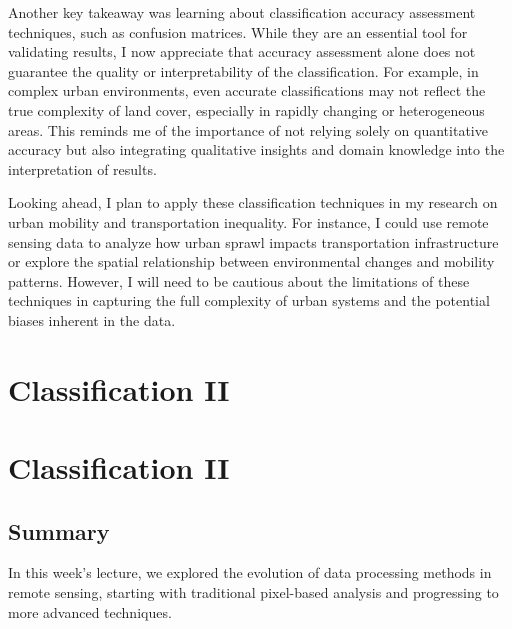 \documentclass[
  letterpaper,
  DIV=11,
  numbers=noendperiod]{scrreprt}
\begin{document}
Another key takeaway was learning about classification accuracy
assessment techniques, such as confusion matrices. While they are an
essential tool for validating results, I now appreciate that accuracy
assessment alone does not guarantee the quality or interpretability of
the classification. For example, in complex urban environments, even
accurate classifications may not reflect the true complexity of land
cover, especially in rapidly changing or heterogeneous areas. This
reminds me of the importance of not relying solely on quantitative
accuracy but also integrating qualitative insights and domain knowledge
into the interpretation of results.

Looking ahead, I plan to apply these classification techniques in my
research on urban mobility and transportation inequality. For instance,
I could use remote sensing data to analyze how urban sprawl impacts
transportation infrastructure or explore the spatial relationship
between environmental changes and mobility patterns. However, I will
need to be cautious about the limitations of these techniques in
capturing the full complexity of urban systems and the potential biases
inherent in the data.


\chapter{Classification II}\label{classification-ii-1}


\chapter{Classification II}\label{classification-ii-2}

\section{Summary}\label{summary-4}

In this week's lecture, we explored the evolution of data processing
methods in remote sensing, starting with traditional pixel-based
analysis and progressing to more advanced techniques.
\end{document}
